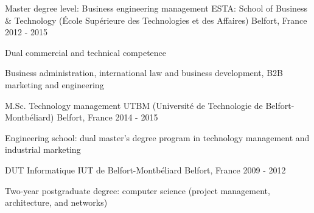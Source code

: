 

\begin{cventries}
\cventry
	{Master degree level: Business engineering management} %
	{ESTA: School of Business \& Technology (École Supérieure des Technologies et des Affaires)} %
	{Belfort, France} %
	{2012 - 2015} %
	{
		\begin{cvitems} %
			\item {Dual commercial and technical competence}
			\item {Business administration, international law and business development, B2B marketing and engineering}
		\end{cvitems}
	}

  \cventry
    {M.Sc. Technology management} %
    {UTBM (Université de Technologie de Belfort-Montbéliard)} %
    {Belfort, France} %
    {2014 - 2015} %
    {
      \begin{cvitems} %
        \item {Engineering school: dual master's degree program in technology management and industrial marketing}
      \end{cvitems}
    }
    


  \cventry
    {DUT Informatique} %
    {IUT de Belfort-Montbéliard} %
    {Belfort, France} %
    {2009 - 2012} %
    {
      \begin{cvitems} %
        \item {Two-year postgraduate degree: computer science (project management, architecture, and networks)}
      \end{cvitems}
    }


\end{cventries}
